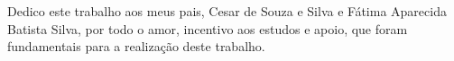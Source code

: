 \begin{dedicatoria}
    Dedico este trabalho aos meus pais, Cesar de Souza e Silva e Fátima Aparecida Batista Silva, por todo o amor, incentivo aos estudos e apoio, que foram fundamentais para a realização deste trabalho.
\end{dedicatoria}
